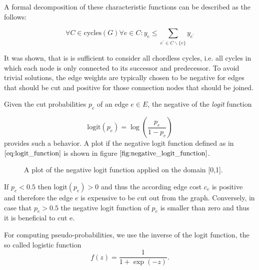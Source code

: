 A formal decomposition of these characteristic functions can be described as the follows:

\begin{equation}
	\forall C \in \text{cycles}(G) \forall e \in C: y_e \leq \sum_{e^{'} \in C \backslash \{e\}} y_{e^{'}}
\end{equation}

It was shown, that is is sufficient to consider all chordless cycles, i.e. all cycles in which each node is only connected to its successor and predecessor. To avoid trivial solutions, the edge weights are typically chosen to be negative for edges that should be cut and positive for those connection nodes that should be joined. 

Given the cut probabilities $p_e$ of an edge $e \in E$, the negative of the \textit{logit} function 

\begin{equation}
	\text{logit}\left( p_e \right) = \log \left( \frac{p_e}{1 - p_e} \right)
	\label{eq:logit_function}
\end{equation}
provides such a behavior. A plot if the negative logit function defined as in $\ref{eq:logit_function}$ is shown in figure $\ref{fig:negative_logit_function}$.

\begin{figure}
\centering
{}
\caption{A plot of the negative logit function applied on the domain [0,1].}
\label{fig:negative_logit_function}
\end{figure}
If $p_e < 0.5$ then $\text{logit}\left( p_e \right) > 0$ and thus the according edge cost $c_e$ is positive and therefore the edge $e$ is expensive to be cut out from the graph. Conversely, in case that $p_e > 0.5$ the negative logit function of $p_e$ is smaller than zero and thus it is beneficial to cut e.

For computing pseudo-probabilities, we use the inverse of the logit function, the so called logistic function
\begin{equation}
	f(z) = \frac{1}{1 + \exp \left( -z \right)}.
	\label{eq:logistic_function}
\end{equation}

